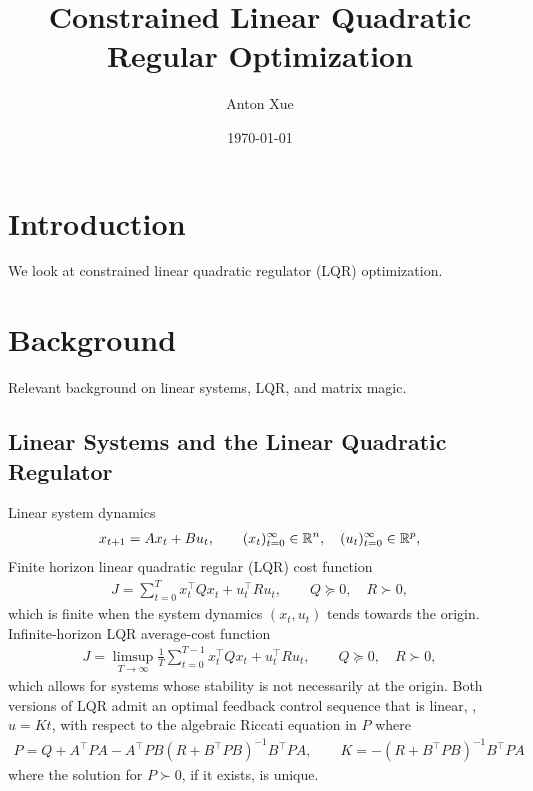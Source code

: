 \documentclass[12pt]{article}
\title{Constrained Linear Quadratic Regular Optimization}
\author{Anton Xue}
\date{\today}
\date{}
\begin{document}
\maketitle

\section{Introduction}
We look at constrained linear quadratic regulator (LQR) optimization.

\section{Background}
Relevant background on linear systems, LQR, and matrix magic.

\subsection{Linear Systems and the Linear Quadratic Regulator}
Linear system dynamics
\begin{align*}
  x_{t + 1} = A x_t + B u_t,
    \qquad (x_t)_{t = 0}^{\infty} \in {\mathbb{R}}^n,
    \quad (u_t)_{t = 0}^{\infty} \in {\mathbb{R}}^p,
\end{align*}
Finite horizon linear quadratic regular (LQR) cost function
\begin{align*}
  J = \sum_{t = 0}^{T} x_t ^\top Q x_t + u_t ^\top R u_t,
    \qquad
    Q \succeq 0, \quad R \succ 0,
\end{align*}
which is finite when the system dynamics \((x_t, u_t)\)
tends towards the origin.
Infinite-horizon LQR average-cost function
\begin{align*}
  J = \limsup_{T \to \infty} \frac{1}{T} \sum_{t = 0}^{T - 1}
        x_t ^\top Q x_t + u_t ^\top R u_t,
    \qquad
    Q \succeq 0, \quad R \succ 0,
\end{align*}
which allows for systems whose stability is not necessarily at the origin.
Both versions of LQR admit an optimal feedback control sequence
that is linear, \ie, \(u = Kt\),
with respect to the algebraic Riccati equation in \(P\) where
\begin{align*}
  P = Q + A^\top P A - A^\top P B (R + B^\top P B)^{-1} B^\top P A,
    \qquad K = -(R + B^\top P B)^{-1} B^\top P A
\end{align*}
where the solution for \(P \succ 0\), if it exists, is unique.
\end{document}

